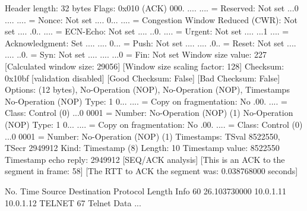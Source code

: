     Header length: 32 bytes
    Flags: 0x010 (ACK)
        000. .... .... = Reserved: Not set
        ...0 .... .... = Nonce: Not set
        .... 0... .... = Congestion Window Reduced (CWR): Not set
        .... .0.. .... = ECN-Echo: Not set
        .... ..0. .... = Urgent: Not set
        .... ...1 .... = Acknowledgment: Set
        .... .... 0... = Push: Not set
        .... .... .0.. = Reset: Not set
        .... .... ..0. = Syn: Not set
        .... .... ...0 = Fin: Not set
    Window size value: 227
    [Calculated window size: 29056]
    [Window size scaling factor: 128]
    Checksum: 0x10bf [validation disabled]
        [Good Checksum: False]
        [Bad Checksum: False]
    Options: (12 bytes), No-Operation (NOP), No-Operation (NOP), Timestamps
        No-Operation (NOP)
            Type: 1
                0... .... = Copy on fragmentation: No
                .00. .... = Class: Control (0)
                ...0 0001 = Number: No-Operation (NOP) (1)
        No-Operation (NOP)
            Type: 1
                0... .... = Copy on fragmentation: No
                .00. .... = Class: Control (0)
                ...0 0001 = Number: No-Operation (NOP) (1)
        Timestamps: TSval 8522550, TSecr 2949912
            Kind: Timestamp (8)
            Length: 10
            Timestamp value: 8522550
            Timestamp echo reply: 2949912
    [SEQ/ACK analysis]
        [This is an ACK to the segment in frame: 58]
        [The RTT to ACK the segment was: 0.038768000 seconds]

No.     Time           Source                Destination           Protocol Length Info
     60 26.103730000   10.0.1.11             10.0.1.12             TELNET   67     Telnet Data ...

